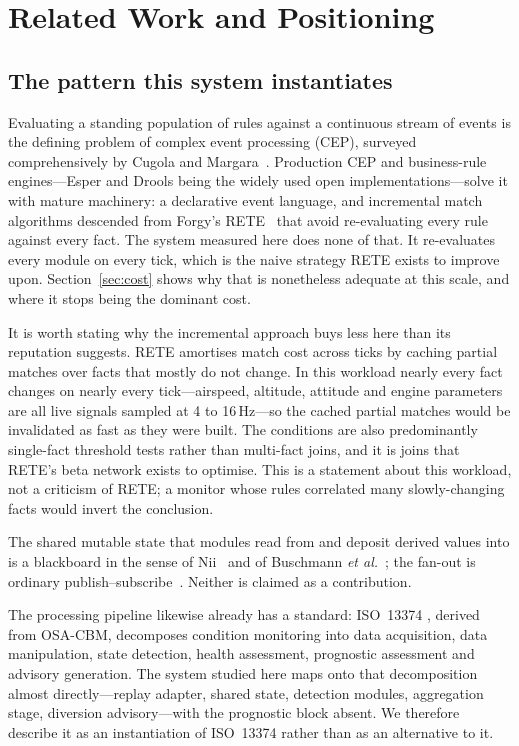 \documentclass[conference]{IEEEtran}
\begin{document}
\section{Related Work and Positioning}
\label{sec:related}

\subsection{The pattern this system instantiates}

Evaluating a standing population of rules against a continuous stream of
events is the defining problem of complex event processing (CEP), surveyed
comprehensively by Cugola and Margara~\cite{cugola2012}. Production CEP and
business-rule engines---Esper and Drools being the widely used open
implementations---solve it with mature machinery: a declarative event
language, and incremental match algorithms descended from Forgy's
RETE~\cite{forgy1982} that avoid re-evaluating every rule against every fact.
The system measured here does none of that. It re-evaluates every module on
every tick, which is the naive strategy RETE exists to improve upon.
Section~\ref{sec:cost} shows why that is nonetheless adequate at this scale,
and where it stops being the dominant cost.

It is worth stating why the incremental approach buys less here than its
reputation suggests. RETE amortises match cost across ticks by caching partial
matches over facts that mostly do not change. In this workload nearly every
fact changes on nearly every tick---airspeed, altitude, attitude and engine
parameters are all live signals sampled at 4 to 16\,Hz---so the cached
partial matches would be invalidated as fast as they were built. The
conditions are also predominantly single-fact threshold tests rather than
multi-fact joins, and it is joins that RETE's beta network exists to optimise.
This is a statement about this workload, not a criticism of RETE; a monitor
whose rules correlated many slowly-changing facts would invert the conclusion.

The shared mutable state that modules read from and deposit derived values
into is a blackboard in the sense of Nii~\cite{nii1986} and of Buschmann
\emph{et al.}~\cite{buschmann1996}; the fan-out is ordinary
publish--subscribe~\cite{hohpe2003}. Neither is claimed as a contribution.

The processing pipeline likewise already has a standard: ISO~13374
\cite{iso13374}, derived from OSA-CBM, decomposes condition monitoring into
data acquisition, data manipulation, state detection, health assessment,
prognostic assessment and advisory generation. The system studied here maps
onto that decomposition almost directly---replay adapter, shared state,
detection modules, aggregation stage, diversion advisory---with the prognostic
block absent. We therefore describe it as an instantiation of ISO~13374 rather
than as an alternative to it.
\end{document}
